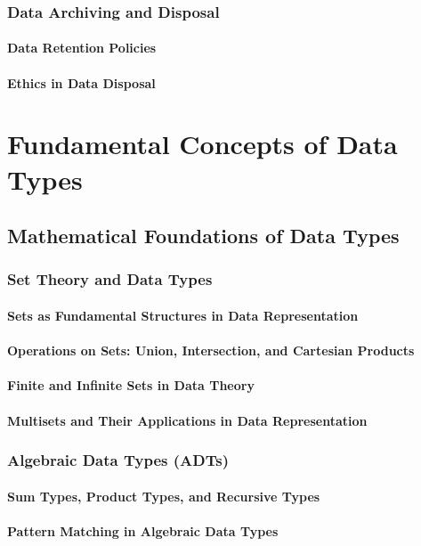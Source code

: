 \documentclass[12pt, oneside]{book}
\begin{document}
\subsection{Data Archiving and Disposal}
\subsubsection{Data Retention Policies}
\subsubsection{Ethics in Data Disposal}

\chapter{Fundamental Concepts of Data Types}
\section{Mathematical Foundations of Data Types}
\subsection{Set Theory and Data Types}
\subsubsection{Sets as Fundamental Structures in Data Representation}
\subsubsection{Operations on Sets: Union, Intersection, and Cartesian Products}
\subsubsection{Finite and Infinite Sets in Data Theory}
\subsubsection{Multisets and Their Applications in Data Representation}
\subsection{Algebraic Data Types (ADTs)}
\subsubsection{Sum Types, Product Types, and Recursive Types}
\subsubsection{Pattern Matching in Algebraic Data Types}
\end{document}
